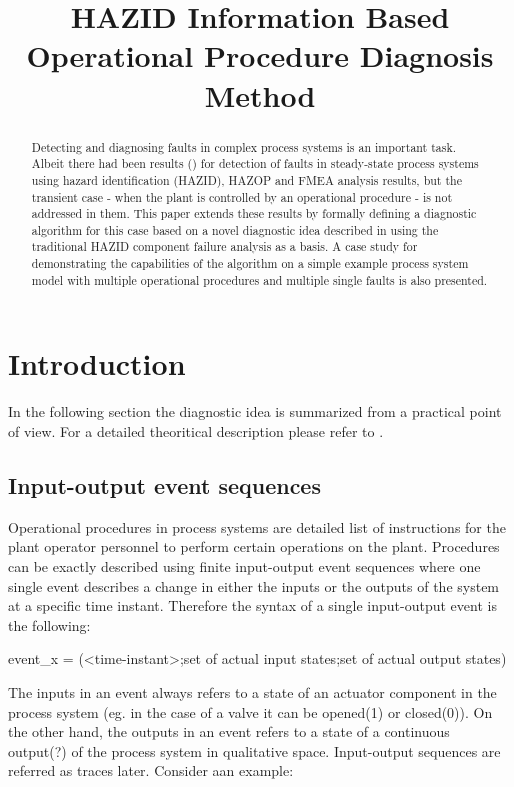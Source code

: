 \documentclass[conference]{IEEEtran}
\title{HAZID Information Based Operational Procedure Diagnosis Method}
\begin{document}
\maketitle

\begin{abstract} 
Detecting and diagnosing faults in complex process systems is an important task. Albeit there had been results (\cite{original}) for detection of faults in steady-state process systems using hazard identification (HAZID), HAZOP and FMEA analysis results, but the transient case - when the plant is controlled by an operational procedure - is not addressed in them. This paper extends these results by formally defining a diagnostic algorithm for this case based on a novel diagnostic idea described in \cite{KES2011} using the traditional HAZID component failure analysis as a basis. A case study for demonstrating the capabilities of the algorithm on a simple example process system model with multiple operational procedures and multiple single faults is also presented.
\end{abstract}

\section{Introduction}

In the following section the diagnostic idea is summarized from a practical point of view. For a detailed theoritical description please refer to \cite{KES2011}.

\subsection{Input-output event sequences}

 Operational procedures in process systems are detailed list of instructions for the plant operator personnel to perform certain operations on the plant. Procedures can be exactly described using finite input-output event sequences where one single event describes a change in either the inputs or the outputs of the system at a specific time instant. Therefore the syntax of a single input-output event is the following:

event_x = (<time-instant>;{set of actual input states};{set of actual output states})

The inputs in an event always refers to a state of an actuator component in the process system (eg. in the case of a valve it can be opened(1) or closed(0)). On the other hand, the outputs in an event refers to a state of a continuous output(?) of the process system in qualitative space. Input-output sequences are referred as traces later. Consider aan example:
\end{document}
